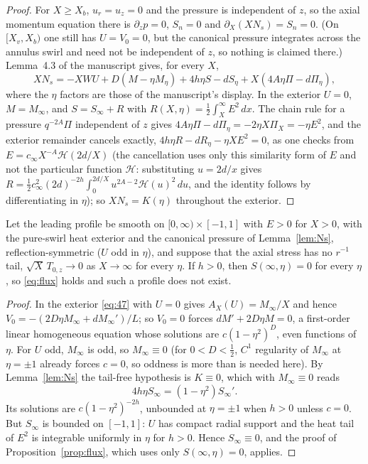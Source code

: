 \documentclass[11pt]{article}
\newcommand{\Sn}{S_n}
\newcommand{\Ns}{N_s}
\newcommand{\AX}{A_X}
\begin{document}
\begin{proof}
For $X\ge X_b$, $u_r=u_z=0$ and the pressure is independent of $z$, so the axial momentum equation there is $\partial_zp=0$, $\Sn=0$ and $\partial_X(X\Ns)=\Sn=0$. (On $[X_v,X_b)$ one still has $U=V_0=0$, but the canonical pressure integrates across the annulus swirl and need not be independent of $z$, so nothing is claimed there.) Lemma~4.3 of the manuscript \cite[(4.16), p.~28]{OpenAINS} gives, for every $X$,
\[
X\Ns=-XWU+D(M-\eta M_\eta)+4h\eta S-dS_\eta+X(4A\eta\Pi-d\Pi_\eta),
\]
where the $\eta$ factors are those of the manuscript's display. In the exterior $U=0$, $M=M_\infty$, and $S=S_\infty+R$ with $R(X,\eta)=\frac12\int_X^\infty E^2\,dx$. The chain rule for a pressure $q^{-2A}\Pi$ independent of $z$ gives $4A\eta\Pi-d\Pi_\eta=-2\eta X\Pi_X=-\eta E^2$, and the exterior remainder cancels exactly, $4h\eta R-dR_\eta-\eta XE^2=0$, as one checks from $E=c_\infty X^{-A}\mathcal H(2d/X)$ (the cancellation uses only this similarity form of $E$ and not the particular function $\mathcal H$: substituting $u=2d/x$ gives $R=\tfrac12c_\infty^2(2d)^{-2h}\int_0^{2d/X}u^{2A-2}\mathcal H(u)^2\,du$, and the identity follows by differentiating in $\eta$); so $X\Ns=K(\eta)$ throughout the exterior.
\end{proof}

\begin{proposition}\label{prop:relaxed}
Let the leading profile be smooth on $[0,\infty)\times[-1,1]$ with $E>0$ for $X>0$, with the pure-swirl heat exterior and the canonical pressure of Lemma~\ref{lem:Ns}, reflection-symmetric ($U$ odd in $\eta$), and suppose that the axial stress has no $r^{-1}$ tail, $\sqrt X\,T_{0,z}\to0$ as $X\to\infty$ for every $\eta$. If $h>0$, then $S(\infty,\eta)=0$ for every $\eta$, so \eqref{eq:flux} holds and such a profile does not exist.
\end{proposition}

\begin{proof}
In the exterior \eqref{eq:47} with $U=0$ gives $\AX(U)=M_\infty/X$ and hence $V_0=-(2D\eta M_\infty+dM_\infty')/L$; so $V_0=0$ forces $dM'+2D\eta M=0$, a first-order linear homogeneous equation whose solutions are $c(1-\eta^2)^D$, even functions of $\eta$. For $U$ odd, $M_\infty$ is odd, so $M_\infty\equiv0$ (for $0<D<\frac12$, $C^1$ regularity of $M_\infty$ at $\eta=\pm1$ already forces $c=0$, so oddness is more than is needed here). By Lemma~\ref{lem:Ns} the tail-free hypothesis is $K\equiv0$, which with $M_\infty\equiv0$ reads
\[
4h\eta S_\infty=(1-\eta^2)S_\infty' .
\]
Its solutions are $c(1-\eta^2)^{-2h}$, unbounded at $\eta=\pm1$ when $h>0$ unless $c=0$. But $S_\infty$ is bounded on $[-1,1]$: $U$ has compact radial support and the heat tail of $E^2$ is integrable uniformly in $\eta$ for $h>0$. Hence $S_\infty\equiv0$, and the proof of Proposition~\ref{prop:flux}, which uses only $S(\infty,\eta)=0$, applies.
\end{proof}
\end{document}
